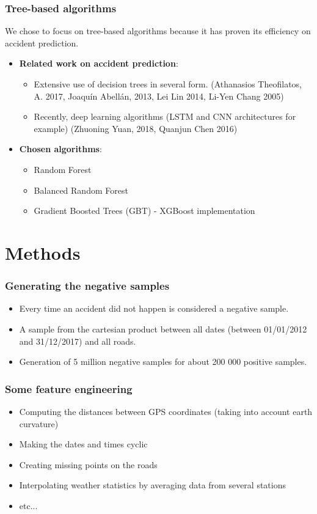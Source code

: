\documentclass[slidestop,compress,red,mathserif]{beamer}
\begin{document}
\begin{frame}
\frametitle{Tree-based algorithms}
We chose to focus on tree-based algorithms because it has proven its efficiency on accident prediction.
\begin{itemize}
\item[] \textbf{Related work on accident prediction}:
  \begin{itemize}
    \item Extensive use of decision trees in several form. (Athanasios Theofilatos, A. 2017, Joaquín Abellán, 2013, Lei Lin 2014, Li-Yen Chang 2005)
    \item Recently, deep learning algorithms (LSTM and CNN architectures for example) (Zhuoning Yuan, 2018, Quanjun Chen 2016)
  \end{itemize}
\item[] \textbf{Chosen algorithms}:
  \begin{itemize}
  	\item Random Forest
    \item Balanced Random Forest
    \item Gradient Boosted Trees (GBT) - XGBoost implementation
  \end{itemize}
\end{itemize}
\end{frame}


\section{Methods}

\begin{frame}
	\frametitle{Generating the negative samples}
	\begin{itemize}
    \item Every time an accident did not happen is considered a negative sample.
		\item A sample from the cartesian product between all dates (between 01/01/2012 and 31/12/2017) and all roads.
		\item Generation of 5 million negative samples for about 200 000 positive samples.
	\end{itemize}
\end{frame}

\begin{frame}
	\frametitle{Some feature engineering}
	\begin{itemize}
		\item Computing the distances between GPS coordinates (taking into account earth curvature)
		\item Making the dates and times cyclic
		\item Creating missing points on the roads
    \item Interpolating weather statistics by averaging data from several stations
    \item etc...
	\end{itemize}
\end{frame}
\end{document}
